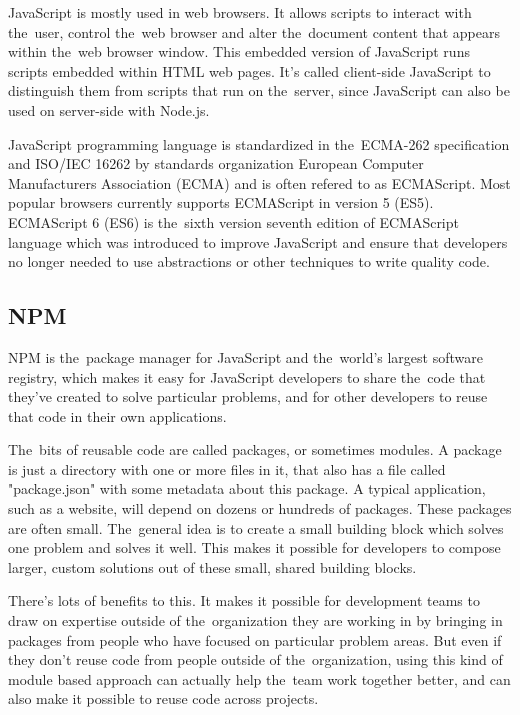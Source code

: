 JavaScript is mostly used in web browsers. It allows scripts to interact with the~user, control the~web browser and alter the~document content that appears within the~web browser window. This embedded version of JavaScript runs scripts embedded within HTML web pages. It's called client-side JavaScript to distinguish them from scripts that run on the~server, since JavaScript can also be used on server-side with Node.js. \cite{flanagan}

JavaScript programming language is standardized in the~ECMA-262 specification and ISO/IEC 16262 by standards organization European Computer Manufacturers Association (ECMA) and is often refered to as ECMAScript. Most popular browsers currently supports ECMAScript in version 5 (ES5). ECMAScript 6 (ES6) is the~sixth version seventh edition of ECMAScript language which was introduced to improve JavaScript and ensure that developers no longer needed to use abstractions or other techniques to write quality code.\cite{narayan}

\subsection{NPM}
NPM is the~package manager for JavaScript and the~world’s largest software registry, which makes it easy for JavaScript developers to share the~code that they've created to solve particular problems, and for other developers to reuse that code in their own applications.\cite{npm}

The~bits of reusable code are called packages, or sometimes modules. A package is just a directory with one or more files in it, that also has a file called "package.json" with some metadata about this package. A typical application, such as a website, will depend on dozens or hundreds of packages. These packages are often small. The~general idea is to create a small building block which solves one problem and solves it well. This makes it possible for developers to compose larger, custom solutions out of these small, shared building blocks.\cite{npm}

There's lots of benefits to this. It makes it possible for development teams to draw on expertise outside of the~organization they are working in by bringing in packages from people who have focused on particular problem areas. But even if they don't reuse code from people outside of the~organization, using this kind of module based approach can actually help the~team work together better, and can also make it possible to reuse code across projects.\cite{npm}

